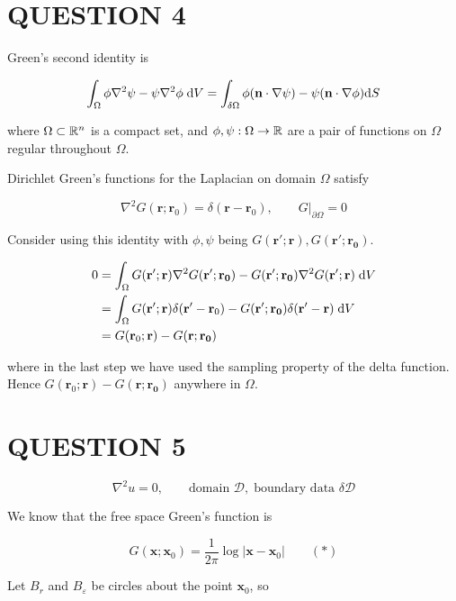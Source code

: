 \documentclass[a4paper]{article}
\begin{document}
\section{QUESTION 4}

Green's second identity is 

\[ \int_{\Omega}  \phi \nabla^{2} \psi  - \psi \nabla^{2} \phi \;  \mathrm{d} V = \int_{\delta \Omega} \phi ( \mathbf{n} \cdot \nabla \psi ) - \psi( \mathbf{n} \cdot \nabla \phi ) \mathrm{d} S   \]

where $ \Omega \subset \mathbb{R}^{n} $ is a compact set, and $ \phi, \psi : \Omega \to \mathbb{R} $ are a pair of functions on $ \Omega $ regular throughout $ \Omega $.

Dirichlet Green's functions for the Laplacian on domain $ \Omega $ satisfy 

\[ \nabla^{2} G(\mathbf{r};\mathbf{r}_{0}) = \delta(\mathbf{r} - \mathbf{r}_{0}), \qquad G |_{\partial \Omega} = 0 \]

Consider using this identity with $ \phi, \psi $ being $ G(\mathbf{r}'; \mathbf{r}), G(\mathbf{r}'; \mathbf{r_{0}})  $.

\begin{align*}
0 & = \int_{\Omega}  G(\mathbf{r}'; \mathbf{r}) \nabla^{2} G(\mathbf{r}'; \mathbf{r_{0}}) - G(\mathbf{r}'; \mathbf{r_{0}}) \nabla^{2} G(\mathbf{r}'; \mathbf{r}) \;  \mathrm{d} V \\
& = \int_{\Omega}  G(\mathbf{r}'; \mathbf{r}) \delta(\mathbf{r}' - \mathbf{r}_{0}) - G(\mathbf{r}'; \mathbf{r_{0}}) \delta(\mathbf{r}' - \mathbf{r}) \;  \mathrm{d} V \\
& = G(\mathbf{r}_{0}; \mathbf{r})  - G(\mathbf{r}; \mathbf{r_{0}})
\end{align*}

where in the last step we have used the sampling property of the delta function. Hence $ G(\mathbf{r}_{0}; \mathbf{r})  - G(\mathbf{r}; \mathbf{r_{0}}) $ anywhere in $ \Omega $.

\section{QUESTION 5}

\[ \nabla^{2} u = 0, \qquad \text{domain } \mathcal{D}, \; \text{boundary data } \delta \mathcal{D} \]

We know that the free space Green's function is

\[ G (\mathbf{x} ; \mathbf{x}_{0} ) = \frac{1}{2\pi} \log | \mathbf{x} - \mathbf{x}_{0} | \qquad (*) \]


Let $ B_{r} $ and $ B_{\varepsilon} $ be circles about the point $ \mathbf{x}_{0} $, so
\end{document}
